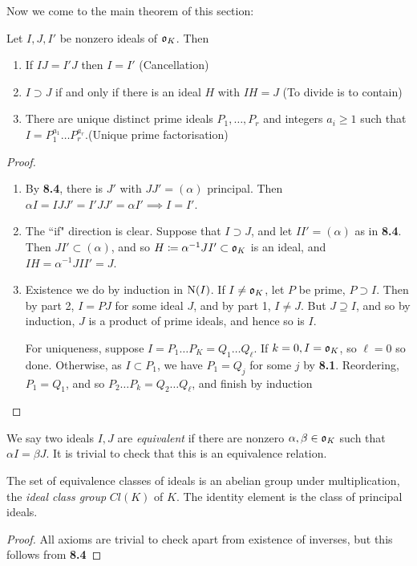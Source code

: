 \documentclass[10pt,a4paper]{article}
\begin{document}
Now we come to the main theorem of this section:
\begin{theorem}
Let $I,J,I'$ be nonzero ideals of $\mathfrak{o}_K$. Then
\begin{enumerate}
\item If $IJ = I'J$ then $I = I'$ \hfill(Cancellation)
\item $I \supset J$ if and only if there is an ideal $H$ with $IH = J$ \hfill(To divide is to contain)
\item There are unique distinct prime ideals $P_1, \ldots, P_r$ and integers $a_i \geq 1$ such that $I = P_1^{a_1}\ldots P_r^{a_r}$.\hfill(Unique prime factorisation)
\end{enumerate}
\end{theorem}
\begin{proof}
\item
\begin{enumerate}
\item By \textbf{8.4}, there is $J'$ with $JJ' = (\alpha)$ principal. Then $\alpha I = IJJ' = I'JJ' = \alpha I' \implies I = I'$.
\item The ``if" direction is clear. Suppose that $I \supset J$, and let $II' = (\alpha)$ as in \textbf{8.4}. Then $JI' \subset (\alpha)$, and so $H \coloneqq \alpha^{-1}JI' \subset \mathfrak{o}_K$ is an ideal, and $IH=\alpha^{-1}JII' = J$.
\item Existence we do by induction in $\operatorname{N}(I)$. If $I \neq \mathfrak{o}_K$, let $P$ be prime, $P \supset I$. Then by part 2, $I = PJ$ for some ideal $J$, and by part 1, $I \neq J$. But $J \supseteq I$, and so by induction, $J$ is a product of prime ideals, and hence so is $I$.

For uniqueness, suppose $I = P_1\ldots P_K = Q_1\ldots Q_{\ell}$. If $k=0, I = \mathfrak{o}_K$, so $\ell = 0$ so done. Otherwise, as $I \subset P_1$, we have $P_1 = Q_j$ for some $j$ by \textbf{8.1}.  Reordering, $P_1 = Q_1$, and so $P_2\ldots P_k = Q_2\ldots Q_\ell$, and finish by induction 
\end{enumerate}
\end{proof}
We say two ideals $I,J$ are \emph{equivalent} if there are nonzero $\alpha, \beta \in \mathfrak{o}_K$ such that $\alpha I = \beta J$. It is trivial to check that this is an equivalence relation. 

\begin{theorem}
The set of equivalence classes of ideals is an abelian group under multiplication, the \emph{ideal class group} $Cl(K)$ of $K$. The identity element is the class of principal ideals.
\end{theorem}
\begin{proof}
All axioms are trivial to check apart from existence of inverses, but this follows from \textbf{8.4}
\end{proof}
\end{document}
